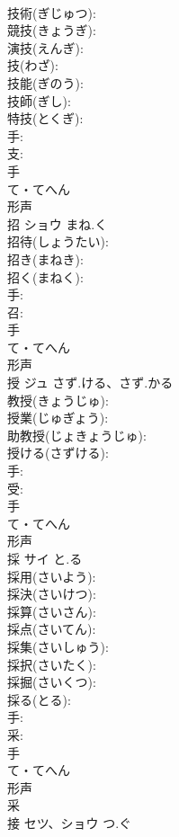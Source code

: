 \documentclass[8pt]{extreport}
\begin{document}
\begin{CJK}{UTF8}{min}
\\	技術(ぎじゅつ): 
\\	競技(きょうぎ): 
\\	演技(えんぎ): 
\\	技(わざ): 
\\	技能(ぎのう): 
\\	技師(ぎし): 
\\	特技(とくぎ): 
\\	手: 
\\	支: 
\\	手	
\\	て・てへん	
\\	形声 
\\	招	ショウ	まね.く		
\\	招待(しょうたい): 
\\	招き(まねき): 
\\	招く(まねく): 
\\	手: 
\\	召: 
\\	手	
\\	て・てへん	
\\	形声 
\\	授	ジュ	さず.ける、さず.かる		
\\	教授(きょうじゅ): 
\\	授業(じゅぎょう): 
\\	助教授(じょきょうじゅ): 
\\	授ける(さずける): 
\\	手: 
\\	受: 
\\	手	
\\	て・てへん	
\\	形声 
\\	採	サイ	と.る		
\\	採用(さいよう): 
\\	採決(さいけつ): 
\\	採算(さいさん): 
\\	採点(さいてん): 
\\	採集(さいしゅう): 
\\	採択(さいたく): 
\\	採掘(さいくつ): 
\\	採る(とる): 
\\	手: 
\\	采: 
\\	手	
\\	て・てへん	
\\	形声 
\\	采 
\\	接	セツ、ショウ	つ.ぐ		

\end{CJK}
\end{document}
